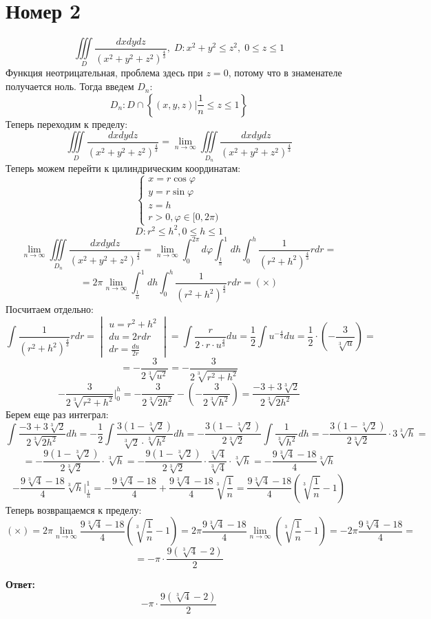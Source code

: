 \documentclass[a4paper,12pt]{article}
\begin{document}
\section*{Номер 2}
\[
\iiint\limits_{D} \frac{dxdydz}{(x^2+y^2+z^2)^{\frac43}}, \; D : x^2 + y^2 \leq z^2, \; 0 \leq z \leq 1
\]
Функция неотрицательная, проблема здесь при $z = 0$, потому что в знаменателе получается ноль. Тогда введем $D_n$:
\[
D_n : D \cap \left\{(x, y, z) \Big| \frac{1}{n} \leq z \leq 1 \right\}
\]
Теперь переходим к пределу:
\[
\iiint\limits_{D} \frac{dxdydz}{(x^2+y^2+z^2)^{\frac43}} = \lim_{n \rightarrow \infty}  \iiint\limits_{D_n} \frac{dxdydz}{(x^2 + y^2+z^2)^{\frac43 }}
\]
Теперь можем перейти к цилиндрическим координатам:
\[
\begin{cases}
x = r \cos \varphi \\
y = r \sin \varphi \\
 z = h \\ 
r > 0,
\varphi \in [0, 2 \pi)
\end{cases}
\]
\[
D : r^2 \leq h^2 , 0 \leq h \leq 1
\]
\[
 \lim_{n \rightarrow \infty}  \iiint\limits_{D_n} \frac{dxdydz}{(x^2 + y^2+z^2)^{\frac43 }}= \lim_{n \rightarrow \infty} \int_0^{2\pi} d \varphi  \int_{\frac1n}^{1} dh \int_0^h \frac{1}{\left(r^2 + h^2\right)^{\frac43}} rdr  = 
\]
\[
= 2 \pi \lim_{n \rightarrow \infty} \int_{\frac1n}^{1} dh \int_0^h \frac{1}{\left(r^2 + h^2\right)^{\frac43}} rdr  = (\times)
\]
Посчитаем отдельно:
\[
\int \frac{1}{(r^2+h^2)^{\frac{4}{3}}} rdr = \begin{vmatrix}
u = r^2 + h^2 \\
du = 2r dr  \\
dr = \frac{du}{2r}
\end{vmatrix} = \int  \frac{r}{2 \cdot r \cdot u^{\frac43}} du  = \frac12 \int u^{-\frac43} du =  \frac{1}{2} \cdot \left(-\frac{3}{\sqrt[3]{u}}\right) = 
\]
\[
=
-\frac{3}{2 \sqrt[3]{u^2}} =-\frac{3}{2 \sqrt[3]{r^2 + h^2}}
\] 
\[
-\frac{3}{2 \sqrt[3]{r^2 + h^2}}\Bigg|^h_0 = -\frac{3}{2\sqrt[3]{2h^2}} - \left(- \frac{3}{2\sqrt[3]{h^2}}\right) = \frac{-3 + 3 \sqrt[3]{2}}{2 \sqrt[3]{2h^2} }
\]
Берем еще раз интеграл:
\[
\int \frac{-3 + 3 \sqrt[3]{2}}{2 \sqrt[3]{2h^2} } dh= -\frac12 \int \frac{3(1 - \sqrt[3]{2})}{\sqrt[3]{2} \cdot \sqrt[3]{h^2}}dh = -\frac{3(1 - \sqrt[3]{2})}{2\sqrt[3]{2}} \int \frac{1}{ \sqrt[3]{h^2}}dh  = -\frac{3(1- \sqrt[3]{2})}{2\sqrt[3]{2}} \cdot 3 \sqrt[3]{h} = 
 \]
\[
=
-\frac{9(1 - \sqrt[3]{2})}{2\sqrt[3]{2}} \cdot  \sqrt[3]{h}  = -\frac{9(1 - \sqrt[3]{2})}{2\sqrt[3]{2}}\cdot \frac{\sqrt[3]{4}}{\sqrt[3]{4}} \cdot  \sqrt[3]{h}  = -\frac{9\sqrt[3]{4} - 18}{4} \sqrt[3]{h}
\]
\[
-\frac{9\sqrt[3]{4} - 18}{4} \sqrt[3]{h} \Bigg|^1_{\frac1n} = -\frac{9\sqrt[3]{4} - 18}{4} + \frac{9\sqrt[3]{4} - 18}{4} \sqrt[3]{\frac{1}{n}} = \frac{9\sqrt[3]{4} - 18}{4} \left(\sqrt[3]{\frac1n} - 1 \right)
\]
 Теперь возвращаемся к пределу:
\[
(\times) = 2 \pi \lim_{n \rightarrow \infty} \frac{9\sqrt[3]{4} - 18}{4} \left(\sqrt[3]{\frac1n} - 1 \right) = 2 \pi \frac{9\sqrt[3]{4} - 18}{4} \lim_{n \rightarrow \infty} \left(\sqrt[3]{\frac1n} - 1 \right) = -2 \pi \frac{9\sqrt[3]{4} - 18}{4}=
\]
\[
=
-\pi \cdot \frac{9(\sqrt[3]{4} - 2)}{2}
\]
\begin{center}
\textbf{Ответ: } 
\[
-\pi \cdot \frac{9(\sqrt[3]{4} - 2)}{2}
\]
\end{center}
\end{document}
